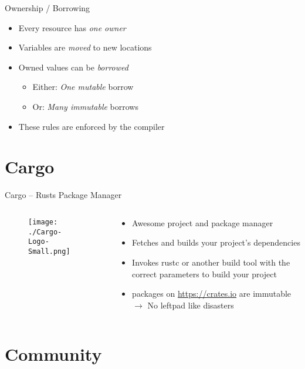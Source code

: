 \documentclass[aspectratio=1610,t]{beamer}
\begin{document}
\begin{frame}[c]{Ownership / Borrowing}
  \begin{itemize}
    \item Every resource has \emph{one owner}
    \item Variables are \emph{moved} to new locations
    \item Owned values can be \emph{borrowed}
      \begin{itemize}
        \item{Either: \emph{One mutable} borrow}
        \item{Or: \emph{Many immutable} borrows}
      \end{itemize}
    \item These rules are enforced by the compiler
  \end{itemize}
\end{frame}

\section{Cargo}

\begin{frame}[c]{Cargo -- Rusts Package Manager}
  \begin{columns}[onlytextwidth]
    \begin{column}{.3\textwidth}
      \centering
      \begin{figure}
      \texttt{[image: ./Cargo-Logo-Small.png]}
      \end{figure}
    \end{column}
    \begin{column}{.7\textwidth}
      \begin{itemize}
        \item Awesome project and package manager
        \item Fetches and builds your project’s dependencies
        \item Invokes rustc or another build tool with the correct parameters
          to build your project
        \item packages on \url{https://crates.io} are immutable\\ $\rightarrow$
          No leftpad like disasters
      \end{itemize}
    \end{column}
  \end{columns}
\end{frame}

\section{Community}
\end{document}
